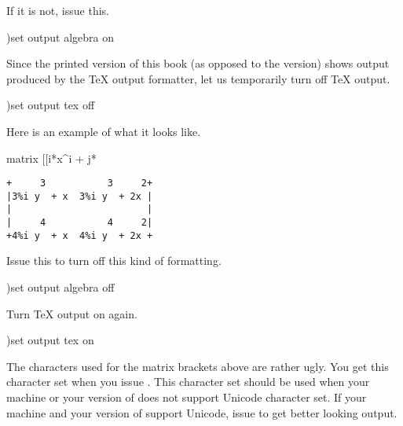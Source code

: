 \begin{nullXtc}
\begin{xtccomment}
If it is not, issue this.
\end{xtccomment}
\begin{spadsrc}
)set output algebra on 
\end{spadsrc}
\end{nullXtc}
\begin{nullXtc}
\begin{xtccomment}
Since the printed version of this book
(as opposed to the \HyperName{} version)
shows output produced by the
\TeX{} output formatter,
let us temporarily turn off
\TeX{} output.
\end{xtccomment}
\begin{spadsrc}
)set output tex off 
\end{spadsrc}
\end{nullXtc}
\begin{nullXtc}
\begin{xtccomment}
Here is an example of what it looks like.
\end{xtccomment}
\begin{spadsrc}
matrix [[i*x^i + j*%
\end{spadsrc}
\end{nullXtc}
\begin{verbatim}
+     3           3     2+
|3%i y  + x  3%i y  + 2x |
|                        |
|     4           4     2|
+4%i y  + x  4%i y  + 2x +
\end{verbatim}

\begin{nullXtc}
\begin{xtccomment}
Issue this to turn off this kind of formatting.
\end{xtccomment}
\begin{spadsrc}
)set output algebra off
\end{spadsrc}
\end{nullXtc}
\begin{nullXtc}
\begin{xtccomment}
Turn \TeX{} output on again.
\end{xtccomment}
\begin{spadsrc}
)set output tex on
\end{spadsrc}
\end{nullXtc}

The characters used for the matrix brackets above are rather ugly.
You get this character set when you issue
.
This character set should be used when your machine or your
version of \Language{}
does not support Unicode character set.
If your machine and your version of \Language{} support Unicode, issue
to get better looking output.

